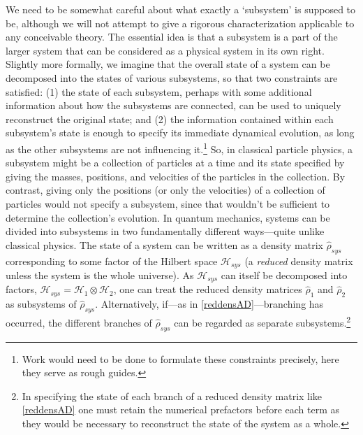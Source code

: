 \documentclass[12pt,onecolumn,secnumarabic,amsmath,amssymb,balancelastpage,nofootinbib]{article}
\begin{document}
We need to be somewhat careful about what exactly a `subsystem' is supposed to be, although we will not attempt to give a rigorous characterization applicable to any conceivable theory. The essential idea is that a subsystem is a part of the larger system that can be considered as a physical system in its own right. Slightly more formally, we imagine that the overall state of a system can be decomposed into the states of various subsystems, so that two constraints are satisfied: (1) the state of each subsystem, perhaps with some additional information about how the subsystems are connected, can be used to uniquely reconstruct the original state; and (2) the information contained within each subsystem's state is enough to specify its immediate dynamical evolution, as long as the other subsystems are not influencing it.\footnote{Work would need to be done to formulate these constraints precisely, here they serve as rough guides.} So, in classical particle physics, a subsystem might be a collection of particles at a time and its state specified by giving the masses, positions, and velocities of the particles in the collection.  By contrast, giving only the positions (or only the velocities) of a collection of particles would not specify a subsystem, since that wouldn't be sufficient to determine the collection's evolution. In quantum mechanics, systems can be divided into subsystems in two fundamentally different ways---quite unlike classical physics.  The state of a system can be written as a density matrix $\widehat{\rho}_{sys}$ corresponding to some factor of the Hilbert space $\mathscr{H}_{sys}$ (a \emph{reduced} density matrix unless the system is the whole universe).  As $\mathscr{H}_{sys}$ can itself be decomposed into factors, $\mathscr{H}_{sys}=\mathscr{H}_1\otimes\mathscr{H}_2$, one can treat the reduced density matrices $\widehat{\rho}_1$ and $\widehat{\rho}_2$ as subsystems of $\widehat{\rho}_{sys}$.  Alternatively, if---as in \eqref{reddensAD}---branching has occurred, the different branches of $\widehat{\rho}_{sys}$ can be regarded as separate subsystems.\footnote{In specifying the state of each branch of a reduced density matrix like \eqref{reddensAD} one must retain the numerical prefactors before each term as they would be necessary to reconstruct the state of the system as a whole.}
\end{document}
